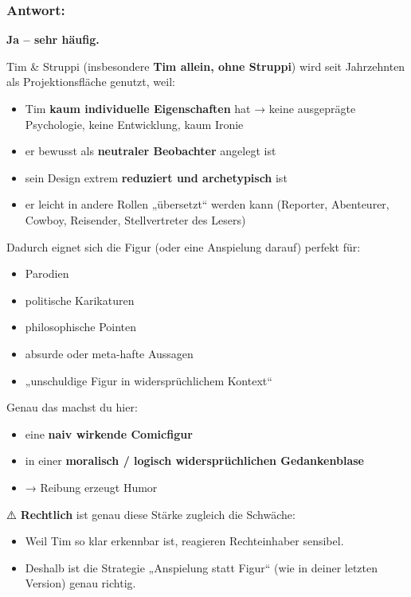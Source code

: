 \documentclass[
  letterpaper,
  DIV=11,
  numbers=noendperiod]{scrartcl}
\providecommand{\tightlist}{%
  \setlength{\itemsep}{0pt}\setlength{\parskip}{0pt}}
\begin{document}
\subsubsection{Antwort:}\label{antwort}

\textbf{Ja -- sehr häufig.}

Tim \& Struppi (insbesondere \textbf{Tim allein, ohne Struppi}) wird
seit Jahrzehnten als Projektionsfläche genutzt, weil:

\begin{itemize}
\tightlist
\item
  Tim \textbf{kaum individuelle Eigenschaften} hat → keine ausgeprägte
  Psychologie, keine Entwicklung, kaum Ironie
\item
  er bewusst als \textbf{neutraler Beobachter} angelegt ist
\item
  sein Design extrem \textbf{reduziert und archetypisch} ist
\item
  er leicht in andere Rollen „übersetzt`` werden kann (Reporter,
  Abenteurer, Cowboy, Reisender, Stellvertreter des Lesers)
\end{itemize}

Dadurch eignet sich die Figur (oder eine Anspielung darauf) perfekt für:

\begin{itemize}
\tightlist
\item
  Parodien
\item
  politische Karikaturen
\item
  philosophische Pointen
\item
  absurde oder meta-hafte Aussagen
\item
  „unschuldige Figur in widersprüchlichem Kontext``
\end{itemize}

Genau das machst du hier:

\begin{itemize}
\tightlist
\item
  eine \textbf{naiv wirkende Comicfigur}
\item
  in einer \textbf{moralisch / logisch widersprüchlichen Gedankenblase}
\item
  → Reibung erzeugt Humor
\end{itemize}

⚠️ \textbf{Rechtlich} ist genau diese Stärke zugleich die Schwäche:

\begin{itemize}
\tightlist
\item
  Weil Tim so klar erkennbar ist, reagieren Rechteinhaber sensibel.
\item
  Deshalb ist die Strategie „Anspielung statt Figur`` (wie in deiner
  letzten Version) genau richtig.
\end{itemize}
\end{document}
